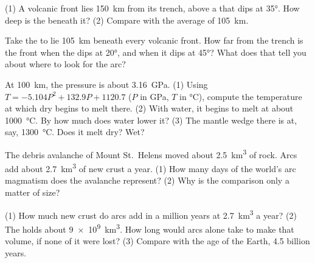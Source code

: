 \begin{exercise}[$\star\star$]\label{exo:g12:subduction-magmatism:6}
(1) A volcanic front lies \qty{150}{km} from its trench, above a  that
dips at \ang{35}. How deep is the  beneath it? (2) Compare with the
average of \qty{105}{km}.
\end{exercise}

\begin{exercise}[$\star\star$]\label{exo:g12:subduction-magmatism:7}
Take the  to lie \qty{105}{km} beneath every volcanic front. How far from
the trench is the front when the  dips at \ang{20}, and when it dips at
\ang{45}? What does that tell you about where to look for the arc?
\end{exercise}

\begin{exercise}[$\star\star$]\label{exo:g12:subduction-magmatism:8}
At \qty{100}{km}, the pressure is about \qty{3.16}{GPa}. (1) Using $T =
-5.104P^2 + 132.9P + 1120.7$ ($P$ in \unit{GPa}, $T$ in \unit{\celsius}),
compute the temperature at which dry  begins to melt there.
(2) With water, it begins to melt at about \qty{1000}{\celsius}. By how much
does water lower it? (3) The mantle wedge there is at, say,
\qty{1300}{\celsius}. Does it melt dry? Wet?
\end{exercise}

\begin{exercise}[$\star\star$]\label{exo:g12:subduction-magmatism:9}
The debris avalanche of Mount St.~Helens moved about \qty{2.5}{km^3} of
rock. Arcs add about \qty{2.7}{km^3} of new crust a year. (1) How many days
of the world's arc magmatism does the avalanche represent? (2) Why is the
comparison only a matter of size?
\end{exercise}

\begin{exercise}[$\star\star$]\label{exo:g12:subduction-magmatism:10}
(1) How much new crust do arcs add in a million years at \qty{2.7}{km^3} a
year? (2) The  holds about \qty{9e9}{km^3}. How long would
arcs alone take to make that volume, if none of it were lost? (3) Compare with
the age of the Earth, 4.5 billion years.
\end{exercise}

